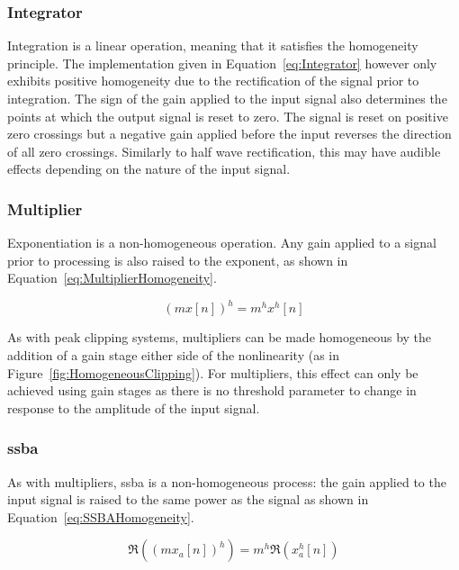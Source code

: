 		\subsubsection*{Integrator}
			Integration is a linear operation, meaning that it satisfies the homogeneity principle. The
			implementation given in Equation~\ref{eq:Integrator} however only exhibits positive homogeneity due
			to the rectification of the signal prior to integration. The sign of the gain applied to the input
			signal also determines the points at which the output signal is reset to zero. The signal is reset
			on positive zero crossings but a negative gain applied before the input reverses the direction of
			all zero crossings. Similarly to half wave rectification, this may have audible effects depending
			on the nature of the input signal.

		\subsubsection*{Multiplier}
			Exponentiation is a non-homogeneous operation. Any gain applied to a signal prior to processing is
			also raised to the exponent, as shown in Equation~\ref{eq:MultiplierHomogeneity}.

			\begin{equation}
				(mx[n])^{h} = m^{h}x^{h}[n]
				\label{eq:MultiplierHomogeneity}
			\end{equation}

			As with peak clipping systems, multipliers can be made homogeneous by the addition of a gain stage
			either side of the nonlinearity (as in Figure~\ref{fig:HomogeneousClipping}). For multipliers, this
			effect can only be achieved using gain stages as there is no threshold parameter to change in
			response to the amplitude of the input signal.

		\subsubsection*{\acrshort{ssba}}
			As with multipliers, \acrshort{ssba} is a non-homogeneous process: the gain applied to the input
			signal is raised to the same power as the signal as shown in Equation~\ref{eq:SSBAHomogeneity}.

			\begin{equation}
				\Re \left( (mx_{a}[n])^{h} \right) = m^{h} \Re \left( x_{a}^{h}[n] \right)
				\label{eq:SSBAHomogeneity}
			\end{equation}
			
